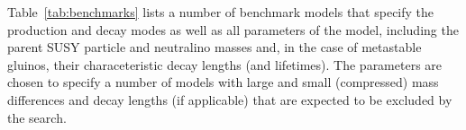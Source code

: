 
Table~\ref{tab:benchmarks} lists a number of benchmark models that
specify the production and decay modes as well as all parameters of
the model, including the parent SUSY particle and neutralino masses
and, in the case of metastable gluinos, their characeteristic decay
lengths (and lifetimes). The parameters are chosen to specify a number
of models with large and small (\ie compressed) mass differences and
decay lengths (if applicable) that are expected to be excluded by the
search. 


